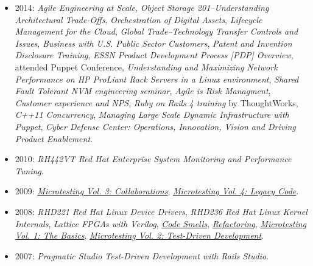 \documentclass[10pt,letterpaper,oneside]{report}
\begin{document}
\begin{itemize}
  \item 2014: \textit{Agile Engineering at Scale},
    \textit{Object Storage 201--Understanding Architectural Trade-Offs},
    \textit{Orchestration of Digital Assets},
    \textit{Lifecycle Management for the Cloud},
    \textit{Global Trade--Technology Transfer Controls and Issues},
    \textit{Business with U.S. Public Sector Customers},
    \textit{Patent and Invention Disclosure Training},
    \textit{ESSN Product Development Process [PDP] Overview},
    attended Puppet Conference,
    \textit{Understanding and Maximizing Network Performance on HP ProLiant Rack Servers in a Linux environment},
    \textit{Shared Fault Tolerant NVM engineering seminar},
    \textit{Agile is Risk Managment},
    \textit{Customer experience and NPS},
    \textit{Ruby on Rails 4 training} by ThoughtWorks,
    \textit{C++11 Concurrency},
    \textit{Managing Large Scale Dynamic Infrastructure with Puppet},
    \textit{Cyber Defense Center: Operations, Innovation, Vision and Driving Product Enablement}.

  \item 2010: \textit{RH442VT Red Hat Enterprise System Monitoring and Performance Tuning}.

  \item 2009: \href{https://elearning.industriallogic.com/gh/submit?Action=AlbumContentsAction&album=collaborations&devLanguage=Cpp}{\textit{Microtesting Vol. 3: Collaborations}},
  \href{https://elearning.industriallogic.com/gh/submit?Action=AlbumContentsAction&album=legacy&devLanguage=Cpp}{\textit{Microtesting Vol. 4: Legacy Code}}.

  \item 2008: \textit{RHD221 Red Hat Linux Device Drivers},
    \textit{RHD236 Red Hat Linux Kernel Internals},
    \textit{Lattice FPGAs with Verilog},
    \href{https://elearning.industriallogic.com/gh/submit?Action=AlbumContentsAction&album=recognizingSmells&devLanguage=Cpp}{\textit{Code Smells}},
    \href{https://elearning.industriallogic.com/gh/submit?Action=AlbumContentsAction&album=foundations&devLanguage=Cpp}{\textit{Refactoring}},
    \href{https://elearning.industriallogic.com/gh/submit?Action=AlbumContentsAction&album=theBasics&devLanguage=Cpp}{\textit{Microtesting Vol. 1: The Basics}},
    \href{https://elearning.industriallogic.com/gh/submit?Action=AlbumContentsAction&album=before&devLanguage=Cpp}{\textit{Microtesting Vol. 2: Test-Driven Development}}.

  \item 2007: \textit{Pragmatic Studio Test-Driven Development with Rails Studio}.


\end{itemize}
\end{document}
